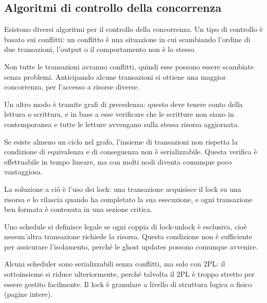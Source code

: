 \subsection{Algoritmi di controllo della concorrenza}
Esistono diversi algoritmi per il controllo della concorrenza. Un tipo di controllo è basato sui conflitti: un conflitto è una situazione in cui scambiando l'ordine di due transazioni, l'output o il comportamento non è lo stesso. 

Non tutte le transazioni avranno conflitti, quindi esse possono essere scambiate senza problemi. Anticipando alcune transazioni si ottiene una maggior concorrenza, per l'accesso a risorse diverse. 

Un altro modo è tramite grafi di precedenza: questo deve tenere conto della lettura o scrittura, e in base a esse verificare che le scritture non siano in contemporanea e tutte le letture avvengano sulla stessa risorsa aggiornata.

Se esiste almeno un ciclo nel grafo, l'insieme di transazioni non rispetta la condizione di equivalenza e di conseguenza non è serializzabile. Questa verifica è effettuabile in tempo lineare, ma con molti nodi diventa comunque poco vantaggiosa. 

La soluzione a ciò è l'uso dei lock: una transazione acquisisce il lock su una risorsa e lo rilascia quando ha completato la sua esecuzione, e ogni transazione ben formata è contenuta in una sezione critica.

Uno schedule si definisce legale se ogni coppia di lock-unlock è esclusiva, cioè nessun'altra transazione richiede la risorsa. Questa condizione non è sufficiente per assicurare l'isolamento, perché le ghost updates possono comunque avvenire. 

Alcuni scheduler sono serializzabili senza conflitti, ma solo con 2PL: il sottoinsieme si riduce ulteriormente, perché talvolta il 2PL è troppo stretto per essere gestito facilmente. Il lock è granulare a livello di struttura logica o fisico (pagine intere). 


 



